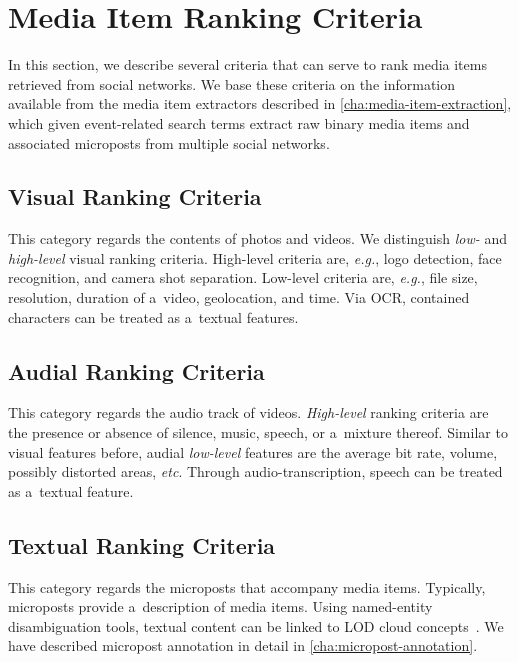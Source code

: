 \section{Media Item Ranking Criteria}

In this section, we describe several criteria that can serve to rank
media items retrieved from social networks. 
We base these criteria on the information available from
the media item extractors described in \autoref{cha:media-item-extraction},
which given event-related search terms
extract raw binary media items and associated microposts
from multiple social networks.

\subsection{Visual Ranking Criteria} \label{sec:visualrankingcriteria}

This category regards the contents of photos and videos.
We distinguish \emph{low-} and \emph{high-level} visual ranking criteria.
High-level criteria are, \emph{e.g.}, logo detection,
face recognition, and camera shot separation.
Low-level criteria are, \emph{e.g.}, file size, resolution,
duration of a~video, geolocation, and time.
Via OCR, contained characters can be treated as a~textual features.

\subsection{Audial Ranking Criteria}

This category regards the audio track of videos.
\emph{High-level} ranking criteria are the presence or absence
of silence, music, speech, or a~mixture thereof.
Similar to visual features before,
audial \emph{low-level} features are the average bit rate,
volume, possibly distorted areas, \emph{etc}.
Through audio-transcription, speech can be treated as a~textual feature.

\subsection{Textual Ranking Criteria}

This category regards the microposts that accompany media items.
Typically, microposts provide a~description of media items.
Using named-entity disambiguation tools,
textual content can be linked to LOD cloud concepts~\cite{Facebook2011}.
We have described micropost annotation in detail in \autoref{cha:micropost-annotation}.


